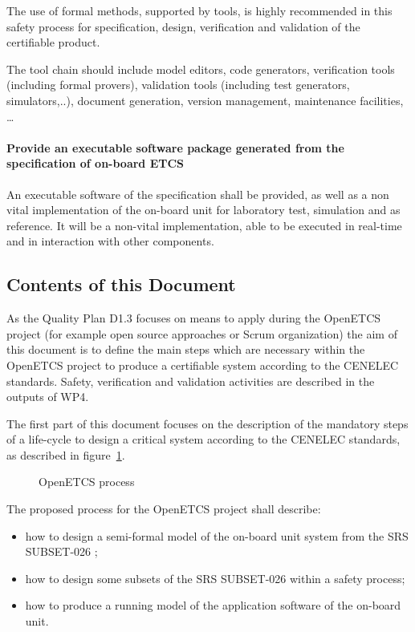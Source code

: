 The use of formal methods, supported by tools, is highly recommended in this safety process for specification, design, verification and validation of the certifiable product.

The tool chain should include model editors, code generators, verification tools (including formal provers), validation tools (including test generators, simulators,..), document generation, version management, maintenance facilities, \dots

\paragraph{Provide an executable software package generated from the specification of on-board ETCS}

An executable software of the specification shall be provided, as well as a non vital implementation of the on-board unit for laboratory test, simulation and as reference. It will be a non-vital  implementation, able to be executed in real-time and in interaction with other components.


\subsection{Contents of this Document}

As the Quality Plan D1.3 focuses on means to apply during the OpenETCS project (for example open source approaches or Scrum organization) the aim of this document is to define the main steps which are necessary within the OpenETCS project to produce a certifiable system according to the CENELEC standards.
Safety, verification and validation activities are described in the outputs of WP4.


The first part of this document focuses on the description of the mandatory steps of a life-cycle to design a critical system according to the CENELEC standards, as described in figure~\ref{fig:OETCSProcess}.

\begin{figure}[h]
  \centering
  \caption{OpenETCS process}
  \label{fig:OETCSProcess}
\end{figure}


The proposed process for the OpenETCS project shall describe:
\begin{itemize}
\item how to design a semi-formal model of the on-board unit system from the SRS SUBSET-026 ;
\item how to design some subsets of the SRS SUBSET-026 within a safety process;
\item how to produce a running model of the application software of the on-board unit.
\end{itemize}

